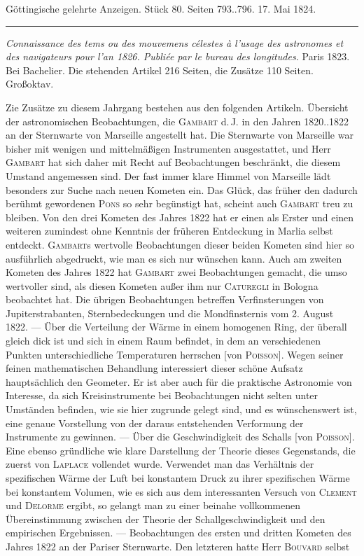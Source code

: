 \clearpage
{}
\hypertarget{native-643-lower}{}
\begin{center}\small Göttingische gelehrte Anzeigen. Stück 80. Seiten 793..796. 17. Mai 1824.\\[3pt]\rule{.72\linewidth}{.3pt}\end{center}

\emph{Connaissance des tems ou des mouvemens célestes à l'usage des astronomes et des navigateurs pour l'an \textup{1826}. Publiée par le bureau des longitudes.} Paris 1823. Bei Bachelier. Die stehenden Artikel 216 Seiten, die Zusätze 110 Seiten. Großoktav.

Zie Zusätze zu diesem Jahrgang bestehen aus den folgenden Artikeln. Übersicht der astronomischen Beobachtungen, die \textsc{Gambart} d.\,J. in den Jahren 1820..1822 an der Sternwarte von Marseille angestellt hat. Die Sternwarte von Marseille war bisher mit wenigen und mittelmäßigen Instrumenten ausgestattet, und Herr \textsc{Gambart} hat sich daher mit Recht auf Beobachtungen beschränkt, die diesem Umstand angemessen sind. Der fast immer klare Himmel von Marseille lädt besonders zur Suche nach neuen Kometen ein. Das Glück, das früher den dadurch berühmt gewordenen \textsc{Pons} so sehr begünstigt hat, scheint auch \textsc{Gambart} treu zu bleiben. Von den drei Kometen des Jahres 1822 hat er einen als Erster und einen weiteren zumindest ohne Kenntnis der früheren Entdeckung in Marlia selbst entdeckt. \textsc{Gambart}s wertvolle Beobachtungen dieser beiden Kometen sind hier so ausführlich abgedruckt, wie man es sich nur wünschen kann. Auch am zweiten Kometen des Jahres 1822 hat \textsc{Gambart} zwei Beobachtungen gemacht, die umso wertvoller sind, als diesen Kometen außer ihm nur \textsc{Caturegli} in Bologna beobachtet hat. Die übrigen Beobachtungen betreffen Verfinsterungen von Jupiterstrabanten, Sternbedeckungen und die Mondfinsternis vom 2. August 1822. --- Über die Verteilung der Wärme in einem homogenen Ring, der überall gleich dick ist und sich in einem Raum befindet, in dem an verschiedenen Punkten unterschiedliche Temperaturen herrschen [von \textsc{Poisson}]. Wegen seiner feinen mathematischen Behandlung interessiert dieser schöne Aufsatz hauptsächlich den Geometer. Er ist aber auch für die praktische Astronomie von Interesse, da sich Kreisinstrumente bei Beobachtungen nicht selten unter Umständen befinden, wie sie hier zugrunde gelegt  sind, und es wünschenswert ist, eine genaue Vorstellung von der daraus entstehenden Verformung der Instrumente zu gewinnen. --- Über die Geschwindigkeit des Schalls [von \textsc{Poisson}]. Eine ebenso gründliche wie klare Darstellung der Theorie dieses Gegenstands, die zuerst von \textsc{Laplace} vollendet wurde. Verwendet man das Verhältnis der spezifischen Wärme der Luft bei konstantem Druck zu ihrer spezifischen Wärme bei konstantem Volumen, wie es sich aus dem interessanten Versuch von \textsc{Clement} und \textsc{Delorme} ergibt, so gelangt man zu einer beinahe vollkommenen Übereinstimmung zwischen der Theorie der Schallgeschwindigkeit und den empirischen Ergebnissen. --- Beobachtungen des ersten und dritten Kometen des Jahres 1822 an der Pariser Sternwarte. Den letzteren hatte Herr \textsc{Bouvard} selbst 